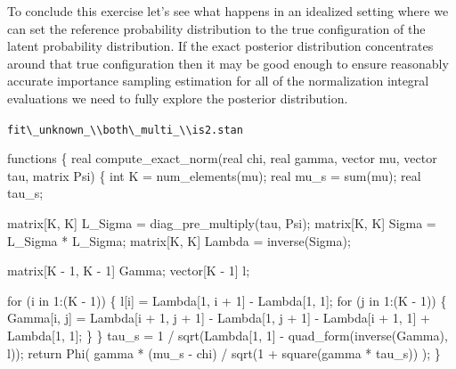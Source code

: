 \documentclass[
  letterpaper,
  DIV=11,
  numbers=noendperiod]{scrartcl}
\newenvironment{Shaded}{\begin{snugshade}}{\end{snugshade}}
\newcommand{\ControlFlowTok}[1]{\textcolor[rgb]{0.00,0.23,0.31}{#1}}
\newcommand{\DataTypeTok}[1]{\textcolor[rgb]{0.68,0.00,0.00}{#1}}
\newcommand{\DecValTok}[1]{\textcolor[rgb]{0.68,0.00,0.00}{#1}}
\newcommand{\KeywordTok}[1]{\textcolor[rgb]{0.00,0.23,0.31}{#1}}
\newcommand{\NormalTok}[1]{\textcolor[rgb]{0.00,0.23,0.31}{#1}}
\begin{document}
To conclude this exercise let's see what happens in an idealized setting
where we can set the reference probability distribution to the true
configuration of the latent probability distribution. If the exact
posterior distribution concentrates around that true configuration then
it may be good enough to ensure reasonably accurate importance sampling
estimation for all of the normalization integral evaluations we need to
fully explore the posterior distribution.

\begin{codelisting}

\caption{\texttt{fit\textbackslash\_unknown\_\textbackslash\textbackslash both\textbackslash\_multi\_\textbackslash\textbackslash is2.stan}}

\begin{Shaded}
\begin{Highlighting}[]
\KeywordTok{functions}\NormalTok{ \{}
  \DataTypeTok{real}\NormalTok{ compute\_exact\_norm(}\DataTypeTok{real}\NormalTok{ chi, }\DataTypeTok{real}\NormalTok{ gamma,}
                          \DataTypeTok{vector}\NormalTok{ mu, }\DataTypeTok{vector}\NormalTok{ tau, }\DataTypeTok{matrix}\NormalTok{ Psi) \{}
    \DataTypeTok{int}\NormalTok{ K = num\_elements(mu);}
    \DataTypeTok{real}\NormalTok{ mu\_s = sum(mu);}
    \DataTypeTok{real}\NormalTok{ tau\_s;}

    \DataTypeTok{matrix}\NormalTok{[K, K] L\_Sigma = diag\_pre\_multiply(tau, Psi);}
    \DataTypeTok{matrix}\NormalTok{[K, K] Sigma = L\_Sigma * L\_Sigma\textquotesingle{};}
    \DataTypeTok{matrix}\NormalTok{[K, K] Lambda = inverse(Sigma);}

    \DataTypeTok{matrix}\NormalTok{[K {-} }\DecValTok{1}\NormalTok{, K {-} }\DecValTok{1}\NormalTok{] Gamma;}
    \DataTypeTok{vector}\NormalTok{[K {-} }\DecValTok{1}\NormalTok{] l;}

    \ControlFlowTok{for}\NormalTok{ (i }\ControlFlowTok{in} \DecValTok{1}\NormalTok{:(K {-} }\DecValTok{1}\NormalTok{)) \{}
\NormalTok{      l[i] = Lambda[}\DecValTok{1}\NormalTok{, i + }\DecValTok{1}\NormalTok{] {-} Lambda[}\DecValTok{1}\NormalTok{, }\DecValTok{1}\NormalTok{];}
      \ControlFlowTok{for}\NormalTok{ (j }\ControlFlowTok{in} \DecValTok{1}\NormalTok{:(K {-} }\DecValTok{1}\NormalTok{)) \{}
\NormalTok{        Gamma[i, j] =  Lambda[i + }\DecValTok{1}\NormalTok{, j + }\DecValTok{1}\NormalTok{]}
\NormalTok{                     {-} Lambda[}\DecValTok{1}\NormalTok{, j + }\DecValTok{1}\NormalTok{] {-} Lambda[i + }\DecValTok{1}\NormalTok{, }\DecValTok{1}\NormalTok{]}
\NormalTok{                     + Lambda[}\DecValTok{1}\NormalTok{, }\DecValTok{1}\NormalTok{];}
\NormalTok{      \}}
\NormalTok{    \}}
\NormalTok{    tau\_s = }\DecValTok{1}\NormalTok{ / sqrt(Lambda[}\DecValTok{1}\NormalTok{, }\DecValTok{1}\NormalTok{] {-} quad\_form(inverse(Gamma), l));}
    \ControlFlowTok{return}\NormalTok{ Phi(  gamma * (mu\_s {-} chi)}
\NormalTok{               / sqrt(}\DecValTok{1}\NormalTok{ + square(gamma * tau\_s)) );}
\NormalTok{  \}}


\end{Highlighting}
\end{Shaded}
\end{codelisting}
\end{document}
